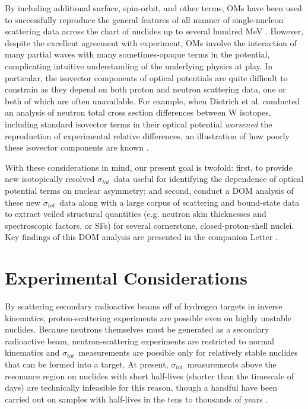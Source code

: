 \documentclass[twocolumn,secnumarabic,amssymb, nobibnotes, aps, prl,
superscriptaddress, nobalancelastpage, floatfix]{revtex4}
\newcommand{\tot}{\ensuremath{\sigma_{tot}}}
\begin{document}
By including additional surface, spin-orbit, and other terms, OMs have been 
used to successfully reproduce the general features of all manner of single-nucleon scattering 
data across the chart of nuclides up to several hundred MeV \cite{Perey1976,
CH89, KoningDelaroche}. However, despite the excellent agreement with experiment, OMs
involve the interaction of many partial waves with many sometimes-opaque terms
in the potential, complicating intuitive understanding of the underlying
physics at play. In particular, the isovector components of optical potentials
are quite difficult to constrain as they depend on both proton and neutron 
scattering data, one or both of which are often unavailable. For example,
when Dietrich et al. conducted an analysis of neutron total cross section
differences between W isotopes, including standard isovector terms in their
optical potential \textit{worsened} the reproduction of experimental
relative differences, an illustration of how poorly these isovector components are known \cite{Dietrich2003}.

With these considerations in mind, our present goal is twofold: first, to
provide new isotopically resolved \tot\ data useful for identifying the 
dependence of optical 
potential terms on nuclear asymmetry; and second, conduct a DOM analysis of these new
\tot\ data along with a large corpus of scattering
and bound-state data to extract veiled structural quantities (e.g. neutron skin
thicknesses and spectroscopic factors, or SFs) for several cornerstone, closed-proton-shell nuclei.
Key findings of this DOM analysis are presented in the companion Letter \cite{Pruitt2020PRL}.

\section{Experimental Considerations}
By scattering secondary radioactive beams off of hydrogen targets in inverse
kinematics, proton-scattering experiments are possible even on highly unstable
nuclides. Because neutrons themselves must be generated as a
secondary radioactive beam, neutron-scattering experiments are restricted to
normal kinematics and \tot\ measurements are possible only for relatively stable
nuclides that can be formed into a target. At present, \tot\ measurements above
the resonance region on nuclides with short half-lives (shorter than the timescale of
days) are technically infeasible for this reason, though a handful have been carried out on
samples with half-lives in the tens to thousands of years \cite{Poenitz1983,
Phillips1980, Foster1971}.
\end{document}
